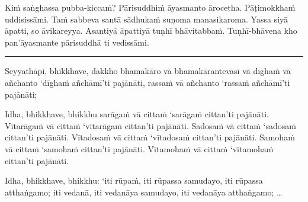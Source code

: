 \documentclass[11pt,oneside]{memoir}
\begin{document}
Kiṁ saṅghassa pubba-kiccaṁ?
Pārisuddhiṁ āyasmanto ārocetha.
Pāṭimokkhaṁ uddisissāmi.
Taṁ sabbeva santā sādhukaṁ suṇoma manasikaroma.
Yassa siyā āpatti, so āvikareyya.
Asantiyā āpattiyā tuṇhī bhāvitabbaṁ.
Tuṇhī-bhāvena kho pan'āyasmante
pārisuddhā ti vedissāmi.

\noindent\rule{\textwidth}{0.5pt}

Seyyathāpi, bhikkhave, dakkho bhamakāro vā bhamakārantevāsī vā dīghaṁ vā
añchanto ‘dīghaṁ añchāmī’ti pajānāti, rassaṁ vā añchanto ‘rassaṁ añchāmī’ti
pajānāti;

Idha, bhikkhave, bhikkhu sarāgaṁ vā cittaṁ ‘sarāgaṁ cittan’ti pajānāti.
Vītarāgaṁ vā cittaṁ ‘vītarāgaṁ cittan’ti pajānāti. Sadosaṁ vā cittaṁ ‘sadosaṁ
cittan’ti pajānāti. Vītadosaṁ vā cittaṁ ‘vītadosaṁ cittan’ti pajānāti. Samohaṁ
vā cittaṁ ‘samohaṁ cittan’ti pajānāti. Vītamohaṁ vā cittaṁ ‘vītamohaṁ cittan’ti
pajānāti.

Idha, bhikkhave, bhikkhu: ‘iti rūpaṁ, iti rūpassa samudayo, iti rūpassa
atthaṅgamo; iti vedanā, iti vedanāya samudayo, iti vedanāya atthaṅgamo; \ldots{}
\end{document}

